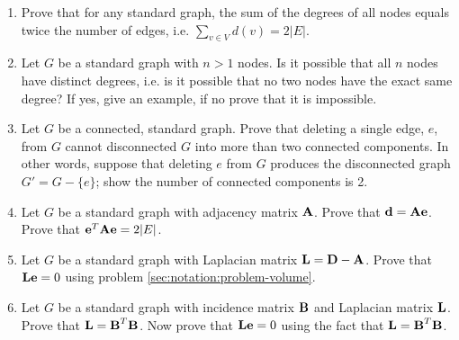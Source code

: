 \begin{enumerate}[label=\ref{sec:notation}.\arabic*]
\item Prove that for any standard graph, the sum of the degrees of all nodes equals twice the number of edges, i.e. $\sum_{v \in V} d(v)  =  2|E|$.

\item Let $G$ be a standard graph with $n>1$ nodes. Is it possible that all $n$ nodes have distinct degrees, i.e. is it possible that no two nodes have the exact same degree? If yes, give an example, if no prove that it is impossible.

\item Let $G$ be a connected, standard graph. Prove that deleting a single edge, $e$, from $G$ cannot disconnected $G$ into more than two connected components. In other words, suppose that deleting $e$ from $G$ produces the disconnected graph $G' = G -\{e\}$; show the number of connected components is 2.

\item\label{sec:notation:problem-volume} Let $G$ be a standard graph with adjacency matrix $\textbf{A}$. Prove that $\textbf{d} = \textbf{A} \textbf{e}$. Prove that $\textbf{e}^T\textbf{A}\textbf{e} = 2 |E|$.

\item\label{sec:notation:problem-laplacian-singular} Let $G$ be a standard graph with Laplacian matrix $\textbf{L} = \textbf{D} - \textbf{A}$. Prove that $\textbf{L}\textbf{e} = 0$ using problem \ref{sec:notation:problem-volume}.

\item\label{sec:notation:problem-laplacian-incidence-decomposition} Let $G$ be a standard graph with incidence matrix $\textbf{B}$ and Laplacian matrix $\textbf{L}$. Prove that $\textbf{L} = \textbf{B}^T\textbf{B}$. Now prove that $\textbf{L}\textbf{e} = 0$ using the fact that $\textbf{L} = \textbf{B}^T\textbf{B}$.

\end{enumerate}
